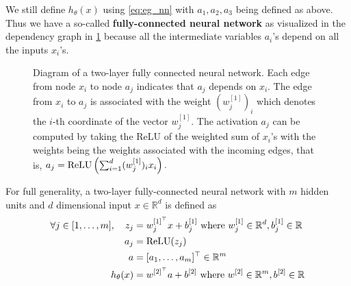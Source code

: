 We still define $h_\theta(x)$ using \cref{eq:eg_nn} with $a_1 ,a_2 ,a_3$ being defined
as above. Thus we have a so-called \textbf{fully-connected neural network} as
visualized in the dependency graph in \cref{fig:fc_nn} because all the intermediate
variables $a_i$'s depend on all the inputs $x_i$'s.

\begin{figure}
    \caption{
        \label{fig:fc_nn}
        Diagram of a two-layer fully connected neural network. Each edge
        from node $x_i$ to node $a_j$ indicates that $a_j$ depends on $x_i$. The edge from $x_i$
        to $a_j$ is associated with the weight $(w^{[1]}_j)_i$ which denotes the $i$-th coordinate
        of the vector $w^{[1]}_j$. The activation $a_j$ can be computed by taking the ReLU of
        the weighted sum of $x_i$'s with the weights being the weights associated with
        the incoming edges, that is, $a_j = \operatorname{ReLU}\left(\sum_{i=1}^d (w^{[1]}_j)_i x_i\right).$    
    }
    \begin{center}
    \end{center}
\end{figure}

For full generality, a two-layer fully-connected neural network with $m$
hidden units and $d$ dimensional input $x \in \mathbb{R}^d$ is defined as
\begin{align}
    \forall j \in [1,\ldots,m],\quad z_j &= w^{[1]^\top}_j x + b^{[1]}_j \text{ where } w^{[1]}_j \in \mathbb{R}^d, b^{[1]}_j \in \mathbb{R}\label{eq:tlfc_nn}\\
    a_j &= \operatorname{ReLU}(z_j)\\
    a &= [a_1 ,\ldots,a_m ]^\top \in \mathbb{R}^m\\
    h_\theta(x) &= w^{[2]^\top} a + b^{[2]} \text{ where } w^{[2]} \in \mathbb{R}^m ,b^{[2]} \in \mathbb{R}\label{eq:nn_predict}
\end{align}


